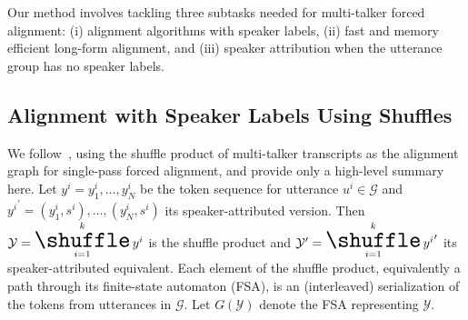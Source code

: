 Our method involves tackling three subtasks needed for multi-talker forced alignment: (i) alignment algorithms with speaker labels, (ii) fast and memory efficient long-form alignment, and (iii) speaker attribution when the utterance group has no speaker labels.
\vspace{-2mm}
\subsection{Alignment with Speaker Labels Using Shuffles}
\label{sec:SpAShl}
We follow~\cite{wiesner2026modeling}, using the shuffle product of multi-talker transcripts as the alignment graph for single-pass forced alignment, and provide only a high-level summary here. Let ${y^i} = y_1^i, \ldots, y_N^i$ be the token sequence for utterance $u^i \in \mathcal{G}$ and ${y^i}^\prime = (y_1^i,s^i), \ldots, (y_N^i,s^i)$ its speaker-attributed version. Then $\mathcal{Y} = \bigshuffle\limits_{i=1}^k {y^i}$ is the shuffle product and $\mathcal{Y^\prime} = \bigshuffle\limits_{i=1}^k {y^i}^\prime$ its speaker-attributed equivalent. Each element of the shuffle product, equivalently a path through its finite-state automaton (FSA), is an (interleaved) serialization of the tokens from utterances in $\mathcal{G}$. Let $G\left(\mathcal{Y}\right)$ denote the FSA representing $\mathcal{Y}$.



